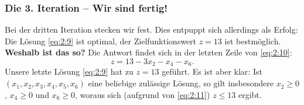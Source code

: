 \documentclass[smaller]{beamer}
\begin{document}
\begin{frame}
  \frametitle{Die 3. Iteration -- Wir sind fertig!}
  \alert{Bei der dritten Iteration stecken wir fest}. Dies entpuppt sich allerdings als \alert{Erfolg:} Die Lösung \eqref{eq:2:9} ist optimal, der Zielfunktionswert $z=13$ ist bestmöglich. \\ \vspace*{0.2cm} 
  \textbf{Weshalb ist das so?} Die Antwort findet sich in der letzten Zeile von \eqref{eq:2:10}:
\begin{equation} \label{eq:2:11}
z = 13 - 3x_2 - x_4 - x_6.
\end{equation}
Unsere letzte Lösung \eqref{eq:2:9} hat zu $z=13$ geführt.  Es ist aber klar: Ist $(x_1,x_2,x_3,x_4,x_5,x_6)$ eine beliebige zulässige Lösung, so gilt insbesondere $x_2 \geq 0$, $x_4 \geq 0$ und $x_6 \geq 0$, woraus sich (aufgrund von \eqref{eq:2:11}) $z \leq 13$ ergibt.
\end{frame}
\end{document}
